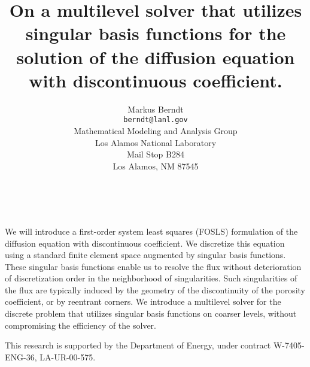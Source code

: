 \documentclass[11pt]{article}
\date{ ~ \hspace{-4mm}}
\title{On a multilevel solver that utilizes singular basis functions for the solution of the diffusion equation with discontinuous coefficient.  }
\author{Markus Berndt \\ {\tt berndt@lanl.gov} \\ Mathematical Modeling and Analysis Group  \\  Los Alamos National Laboratory  \\  Mail Stop B284  \\  Los Alamos, NM 87545  \\}
\begin{document}
\maketitle
\thispagestyle{empty}





 



We will introduce a first-order system least squares (FOSLS) formulation 
of the diffusion equation with discontinuous coefficient. We discretize this
equation using a standard finite element space augmented by singular basis 
functions. These singular basis functions enable us to resolve the flux 
without deterioration of discretization order in the neighborhood of 
singularities. Such singularities of the flux are typically induced by the 
geometry of the discontinuity of the porosity coefficient, or by reentrant 
corners. We introduce a multilevel solver for the discrete problem that 
utilizes singular basis functions on coarser levels, without compromising 
the efficiency of the solver.

  This research is supported by the Department of Energy, under contract
W-7405-ENG-36, LA-UR-00-575. 
\end{document}
